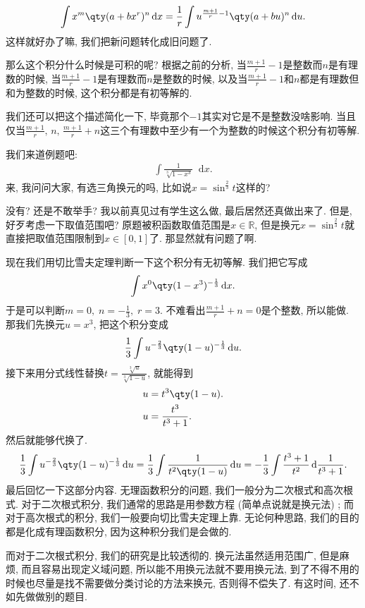 \documentclass{ctexbook}
\newcommand*{\dif}{\mathop{}\!\mathrm{d}}
\begin{document}
{\begin{align*}
\int x^{m}\qty(a+bx^{r})^{n}\dif{x}=\frac{1}{r}\int u^{\frac{m+1}{r}-1}\qty(a+bu)^{n}\dif{u}
.\end{align*}
这样就好办了嘛, 我们把新问题转化成旧问题了. \par
那么这个积分什么时候是可积的呢? 根据之前的分析, 当$\frac{m+1}{r}-1$是整数而$n$是有理数的时候, 当$\frac{m+1}{r}-1$是有理数而$n$是整数的时候, 以及当$\frac{m+1}{r}-1$和$n$都是有理数但和为整数的时候, 这个积分都是有初等解的. \par
我们还可以把这个描述简化一下, 毕竟那个$-1$其实对它是不是整数没啥影响. 当且仅当$\frac{m+1}{r},\,n,\,\frac{m+1}{r}+n$这三个有理数中至少有一个为整数的时候这个积分有初等解. \par
我们来道例题吧: 
\begin{align*}
\int\frac{1}{\sqrt[3]{1-x^{3}}}\dif{x}
.\end{align*}
来, 我问问大家, 有选三角换元的吗, 比如说$x=\sin^{\frac{2}{3}}{t}$这样的? \par
没有? 还是不敢举手? 我以前真见过有学生这么做, 最后居然还真做出来了. 但是, 好歹考虑一下取值范围吧? 原题被积函数取值范围是$x\in\mathbb{R}$, 但是换元$x=\sin^{\frac{2}{3}}{t}$就直接把取值范围限制到$x\in\left[0,1\right]$了. 那显然就有问题了啊. \par
现在我们用切比雪夫定理判断一下这个积分有无初等解. 我们把它写成
\begin{align*}
\int x^{0}\qty(1-x^{3})^{-\frac{1}{3}}\dif{x}
.\end{align*}
于是可以判断$m=0,\;n=-\frac{1}{3},\;r=3$. 不难看出$\frac{m+1}{r}+n=0$是个整数, 所以能做. 那我们先换元$u=x^{3}$, 把这个积分变成
\begin{align*}
\frac{1}{3}\int u^{-\frac{2}{3}}\qty(1-u)^{-\frac{1}{3}}\dif{u}
.\end{align*}
接下来用分式线性替换$t=\frac{\sqrt[3]{u}}{\sqrt[3]{1-u}}$, 就能得到
\begin{align*}
u={}&t^{3}\qty(1-u).\\
u={}&\frac{t^{3}}{t^{3}+1}
.\end{align*}
然后就能够代换了. 
\begin{align*}
\frac{1}{3}\int u^{-\frac{2}{3}}\qty(1-u)^{-\frac{1}{3}}\dif{u}=\frac{1}{3}\int\frac{1}{t^{2}\qty(1-u)}\dif{u}=-\frac{1}{3}\int\frac{t^{3}+1}{t^{2}}\dif{\frac{1}{t^{3}+1}}
.\end{align*}
最后回忆一下这部分内容. 无理函数积分的问题, 我们一般分为二次根式和高次根式. 对于二次根式积分, 我们通常的思路是用参数方程 (简单点说就是换元法) ; 而对于高次根式的积分, 我们一般要向切比雪夫定理上靠. 无论何种思路, 我们的目的都是化成有理函数积分, 因为这种积分我们是会做的. \par
而对于二次根式积分, 我们的研究是比较透彻的. 换元法虽然适用范围广, 但是麻烦, 而且容易出现定义域问题, 所以能不用换元法就不要用换元法, 到了不得不用的时候也尽量是找不需要做分类讨论的方法来换元, 否则得不偿失了. 有这时间, 还不如先做做别的题目. \par
\newpage
}{
\pagestyle{fancy}
\fancyhf{}
\renewcommand{\headrulewidth}{0pt}
\fancyhead[RO,LE]{\thepage}
}
\end{document}
